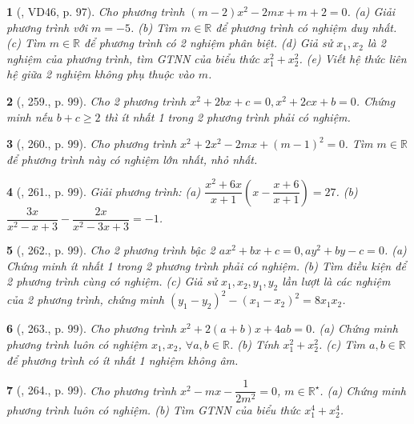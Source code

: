 \documentclass{article}
\newtheorem{baitoan}{}
\begin{document}
\begin{baitoan}[\cite{Tuyen_Toan_9_old}, VD46, p. 97]
	Cho phương trình $(m - 2)x^2 - 2mx + m + 2 = 0$. (a) Giải phương trình với $m = -5$. (b) Tìm $m\in\mathbb{R}$ để phương trình có nghiệm duy nhất. (c) Tìm $m\in\mathbb{R}$ để phương trình có 2 nghiệm phân biệt. (d) Giả sử $x_1,x_2$ là 2 nghiệm của phương trình, tìm {\rm GTNN} của biểu thức $x_1^2 + x_2^2$. (e) Viết hệ thức liên hệ giữa 2 nghiệm không phụ thuộc vào $m$.
\end{baitoan}

\begin{baitoan}[\cite{Tuyen_Toan_9_old}, 259., p. 99]
	Cho 2 phương trình $x^2 + 2bx + c = 0,x^2 + 2cx + b = 0$. Chứng minh nếu $b + c\ge2$ thì ít nhất 1 trong 2 phương trình phải có nghiệm.
\end{baitoan}

\begin{baitoan}[\cite{Tuyen_Toan_9_old}, 260., p. 99]
	Cho phương trình $x^2 + 2x^2 - 2mx + (m - 1)^2 = 0$. Tìm $m\in\mathbb{R}$ để phương trình này có nghiệm lớn nhất, nhỏ nhất.
\end{baitoan}

\begin{baitoan}[\cite{Tuyen_Toan_9_old}, 261., p. 99]
	Giải phương trình: (a) $\dfrac{x^2 + 6x}{x + 1}\left(x - \dfrac{x + 6}{x + 1}\right) = 27$. (b) $\dfrac{3x}{x^2 - x + 3} - \dfrac{2x}{x^2 - 3x + 3} = -1$.
\end{baitoan}

\begin{baitoan}[\cite{Tuyen_Toan_9_old}, 262., p. 99]
	Cho 2 phương trình bậc 2 $ax^2 + bx + c = 0,ay^2 + by - c = 0$. (a) Chứng minh ít nhất 1 trong 2 phương trình phải có nghiệm. (b) Tìm điều kiện để 2 phương trình cùng có nghiệm. (c) Giả sử $x_1,x_2,y_1,y_2$ lần lượt là các nghiệm của 2 phương trình, chứng minh $(y_1 - y_2)^2 - (x_1 - x_2)^2 = 8x_1x_2$.
\end{baitoan}

\begin{baitoan}[\cite{Tuyen_Toan_9_old}, 263., p. 99]
	Cho phương trình $x^2 + 2(a + b)x + 4ab = 0$. (a) Chứng minh phương trình luôn có nghiệm $x_1,x_2$, $\forall a,b\in\mathbb{R}$. (b) Tính $x_1^2 + x_2^2$. (c) Tìm $a,b\in\mathbb{R}$ để phương trình có ít nhất 1 nghiệm không âm.
\end{baitoan}

\begin{baitoan}[\cite{Tuyen_Toan_9_old}, 264., p. 99]
	Cho phương trình $x^2 - mx - \dfrac{1}{2m^2} = 0$, $m\in\mathbb{R}^\star$. (a) Chứng minh phương trình luôn có nghiệm. (b) Tìm {\rm GTNN} của biểu thức $x_1^4 + x_2^4$.
\end{baitoan}
\end{document}
